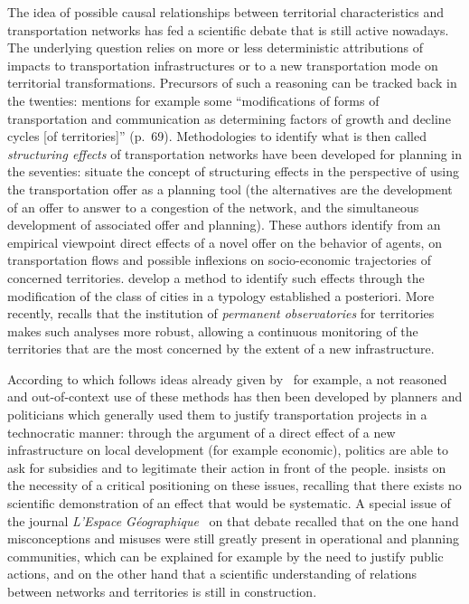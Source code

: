 The idea of possible causal relationships between territorial characteristics and transportation networks has fed a scientific debate that is still active nowadays. The underlying question relies on more or less deterministic attributions of impacts to transportation infrastructures or to a new transportation mode on territorial transformations. Precursors of such a reasoning can be tracked back in the twenties: \cite{burgess1925city} mentions for example some ``modifications of forms of transportation and communication as determining factors of growth and decline cycles [of territories]'' (p.~69). Methodologies to identify what is then called \emph{structuring effects} of transportation networks have been developed for planning in the seventies: \cite{bonnafous1974methodologies} situate the concept of structuring effects in the perspective of using the transportation offer as a planning tool (the alternatives are the development of an offer to answer to a congestion of the network, and the simultaneous development of associated offer and planning). These authors identify from an empirical viewpoint direct effects of a novel offer on the behavior of agents, on transportation flows and possible inflexions on socio-economic trajectories of concerned territories. \cite{bonnafous1974detection} develop a method to identify such effects through the modification of the class of cities in a typology established a posteriori. More recently, \cite{bonnafous2014observatoires} recalls that the institution of \emph{permanent observatories} for territories makes such analyses more robust, allowing a continuous monitoring of the territories that are the most concerned by the extent of a new infrastructure.

According to \cite{offner1993effets} which follows ideas already given by~\cite{franccois1977autoroutes} for example, a not reasoned and out-of-context use of these methods has then been developed by planners and politicians which generally used them to justify transportation projects in a technocratic manner: through the argument of a direct effect of a new infrastructure on local development (for example economic), politics are able to ask for subsidies and to legitimate their action in front of the people. \cite{offner1993effets} insists on the necessity of a critical positioning on these issues, recalling that there exists no scientific demonstration of an effect that would be systematic. A special issue of the journal \emph{L'Espace Géographique}~\citep{espacegeo2014effets} on that debate recalled that on the one hand misconceptions and misuses were still greatly present in operational and planning communities, which can be explained for example by the need to justify public actions, and on the other hand that a scientific understanding of relations between networks and territories is still in construction. 


